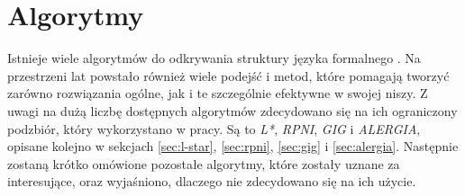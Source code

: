 \chapter{Algorytmy}
\label{cha:algorytmy}

Istnieje wiele algorytmów do odkrywania struktury języka formalnego \cite{L_STAR, RPNI, GIG, ALERGIA, ECGI, k-TSSI, MGGI, reversible-languages-algorithms}. Na przestrzeni lat powstało również wiele podejść i metod, które pomagają tworzyć zarówno rozwiązania ogólne, jak i te szczególnie efektywne w swojej niszy. Z uwagi na dużą liczbę dostępnych algorytmów zdecydowano się na ich ograniczony podzbiór, który wykorzystano w pracy. Są to \textit{L*}, \textit{RPNI}, \textit{GIG} i \textit{ALERGIA}, opisane kolejno w sekcjach \ref{sec:l-star}, \ref{sec:rpni}, \ref{sec:gig} i \ref{sec:alergia}. Następnie zostaną krótko omówione pozostałe algorytmy, które zostały uznane za interesujące, oraz wyjaśniono, dlaczego nie zdecydowano się na ich użycie.






